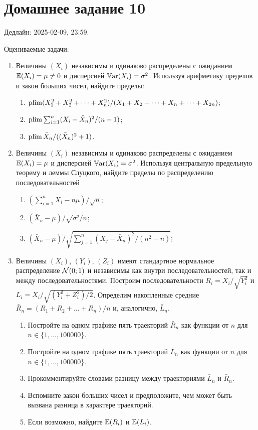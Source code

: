 \section*{Домашнее задание 10}


Дедлайн: 2025-02-09, 23:59.

\newcommand{\dBeta}{\mathrm{Beta}}

Оцениваемые задачи:

\begin{enumerate}

\item Величины $(X_i)$ независимы и одинаково распределены с ожиданием $\operatorname{\mathbb{E}}(X_i) = \mu \neq 0$ и дисперсией $\operatorname{\mathbb{V}ar}(X_i) = \sigma^2$.
Используя арифметику пределов и закон больших чисел, найдите пределы:
\begin{enumerate}
    \item $\operatorname{plim} (X_1^2 + X_2^2 + \dots + X_n^2) / (X_1 + X_2 + \dots + X_n + \dots + X_{2n})$;
    \item $\operatorname{plim} \sum_{i=1}^n (X_i - \bar X_n)^2 / (n - 1)$;
    \item $\operatorname{plim} \bar X_n / ((\bar X_n)^2 + 1)$.
\end{enumerate}


\item Величины $(X_i)$ независимы и одинаково распределены с ожиданием $\operatorname{\mathbb{E}}(X_i) = \mu$ и дисперсией $\operatorname{\mathbb{V}ar}(X_i) = \sigma^2$.
Используя центральную предельную теорему и леммы Слуцкого, найдите пределы по распределению последовательностей 
\begin{enumerate}
    \item $(\sum_{i=1}^n X_i  -  n\mu) /\sqrt{n}$;
    \item $(\bar X_n - \mu) / \sqrt{\sigma^2/n}$;
    \item $(\bar X_n - \mu) / \sqrt{\sum_{j=1}^n (X_j - \bar X_n)^2 / (n^2 - n)}$;
\end{enumerate}


\item Величины $(X_i)$, $(Y_i)$, $(Z_i)$ имеют стандартное нормальное распределение $\mathcal{N}(0; 1)$ и независимы как внутри последовательностей, так и между последовательностями.
Построим последовательности $R_i = X_i / \sqrt{Y_i^2}$ и $L_i = X_i /\sqrt{(Y_i^2 + Z_i^2)/2}$.
Определим накопленные средние $\bar R_n = (R_1 + R_2 + \dots + R_n) / n$ и, аналогично, $\bar L_n$.

\begin{enumerate}
    \item Постройте на одном графике пять траекторий $\bar R_n$ как функции от $n$ для $n \in \{1, \dots, 100000\}$.
    \item Постройте на одном графике пять траекторий $\bar L_n$ как функции от $n$ для $n \in \{1, \dots, 100000\}$.
    \item Прокомментируйте словами разницу между траекториями $\bar L_n$ и $\bar R_n$.
    \item Вспомните закон больших чисел и предположите, чем может быть вызвана разница в характере траекторий.
    \item Если возможно, найдите $\operatorname{\mathbb{E}}(R_i)$ и $\operatorname{\mathbb{E}}(L_i)$.
\end{enumerate}


\end{enumerate}
